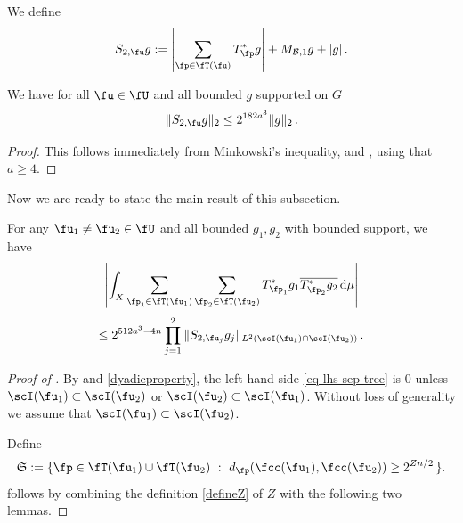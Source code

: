 We define
$$
    S_{2,\fu}g := \left|\sum_{\fp \in \fT(\fu)} T_{\fp}^*g \right| + M_{\mathcal{B},1}g + |g|\,.
$$
\begin{lemma}
    \label{adjoint-tree-control}
    \leanok
    We have for all $\fu \in \fU$ and all bounded $g$ supported on $G$
    $$
        \|S_{2, \fu} g\|_2 \le 2^{182a^3} \|g\|_2\,.
    $$
\end{lemma}

\begin{proof}
    \leanok
    This follows immediately from Minkowski's inequality,  and , using that $a \ge 4$.
\end{proof}


Now we are ready to state the main result of this subsection.

\begin{lemma}
    \label{correlation-separated-trees}
    \leanok
    For any $\fu_1 \ne \fu_2 \in \fU$ and all bounded $g_1, g_2$ with bounded support, we have
    \begin{equation}
        \label{eq-lhs-sep-tree}
        \left| \int_X \sum_{\fp_1 \in \fT(\fu_1)} \sum_{\fp_2 \in \fT(\fu_2)} T^*_{\fp_1}g_1 \overline{T^*_{\fp_2}g_2 }\,\mathrm{d}\mu \right|
    \end{equation}
    \begin{equation}
        \label{eq-rhs-sep-tree}
        \le 2^{512a^3-4n} \prod_{j =1}^2 \| S_{2, \fu_j} g_j\|_{L^2(\scI(\fu_1) \cap \scI(\fu_2))}\,.
    \end{equation}
\end{lemma}

\begin{proof}[Proof of ]
    \leanok
    By  and \eqref{dyadicproperty}, the left hand side \eqref{eq-lhs-sep-tree} is $0$ unless $\scI(\fu_1) \subset \scI(\fu_2)$ or $\scI(\fu_2) \subset \scI(\fu_1)$. Without loss of generality we assume that $\scI(\fu_1) \subset \scI(\fu_2)$.

    Define
    \begin{equation}
        \label{def-Tree-S-set}
         \mathfrak{S} := \{\fp \in \fT(\fu_1) \cup \fT(\fu_2) \ : \ d_{\fp}(\fcc(\fu_1), \fcc(\fu_2)) \ge 2^{Zn/2}\,\}.
    \end{equation}
     follows by combining the definition \eqref{defineZ} of $Z$ with the following two lemmas.
\end{proof}

